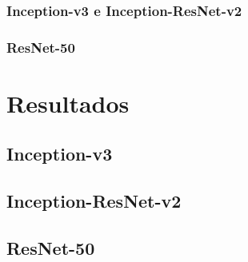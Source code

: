    
    
    
    
	



\subsubsection{Inception-v3 e Inception-ResNet-v2}


\subsubsection{ResNet-50}


\section{Resultados}

\subsection{Inception-v3}

\cite{Inception-v3}

\subsection{Inception-ResNet-v2}


\cite{Inception-ResNet}


\subsection{ResNet-50}

\cite{ResNet}


